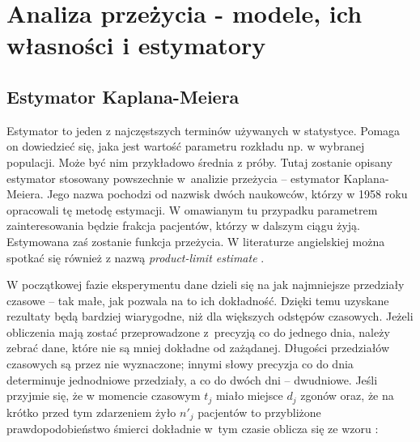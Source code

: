 \documentclass[licencjacka]{pwr_wmat_praca_dyplomowa}
\theoremstyle{plain}
\numberwithin{theorem}{chapter}
\theoremstyle{definition}
\numberwithin{theorem}{chapter}
\begin{document}



                     


\chapter{Analiza przeżycia - modele, ich własności i estymatory}
 \section{Estymator Kaplana-Meiera}

Estymator to jeden z najczęstszych terminów używanych w statystyce. Pomaga on dowiedzieć się, jaka jest wartość parametru rozkładu np. w wybranej populacji.  Może być nim przykładowo średnia z próby. Tutaj zostanie opisany estymator stosowany powszechnie w~analizie przeżycia -- estymator Kaplana-Meiera. Jego nazwa pochodzi od nazwisk dwóch naukowców, którzy w 1958 roku opracowali tę metodę estymacji. W omawianym tu przypadku parametrem zainteresowania będzie frakcja pacjentów, którzy w dalszym ciągu żyją. Estymowana zaś zostanie funkcja przeżycia. W literaturze angielskiej można spotkać się również z nazwą \textit{product-limit estimate} \cite{kme}.

W początkowej fazie eksperymentu dane dzieli się na jak najmniejsze przedziały czasowe -- tak małe, jak pozwala na to ich dokładność. Dzięki temu uzyskane rezultaty będą bardziej wiarygodne, niż dla większych odstępów czasowych. Jeżeli obliczenia mają zostać przeprowadzone z~precyzją co do jednego dnia, należy zebrać dane, które nie są mniej dokładne od zażądanej. Długości przedziałów czasowych są przez nie wyznaczone; innymi słowy precyzja co do dnia determinuje jednodniowe przedziały, a co do dwóch dni -- dwudniowe. 
Jeśli przyjmie się, że w momencie czasowym $t_j$ miało miejsce $d_j$ zgonów oraz, że na krótko przed tym zdarzeniem żyło $n'_j$ pacjentów to przybliżone prawdopodobieństwo śmierci dokładnie w~tym czasie oblicza się ze wzoru \cite{smimr}:
\end{document}
